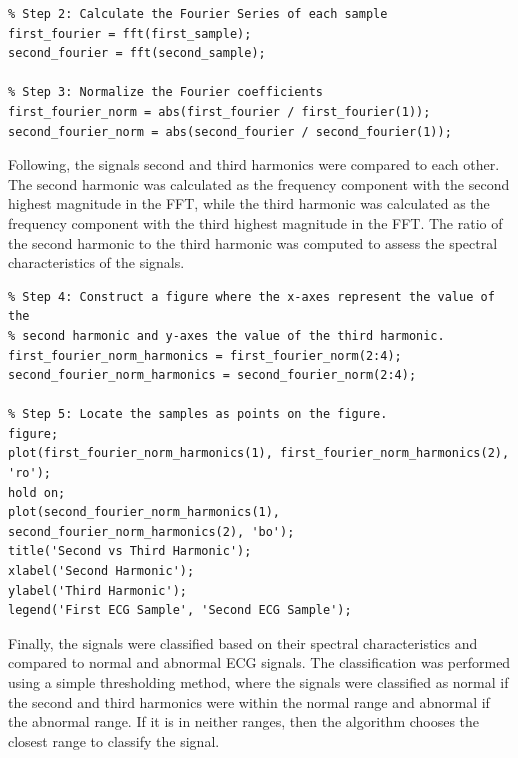 \documentclass{zc-ust-hw}
\begin{document}
\begin{verbatim}
% Step 2: Calculate the Fourier Series of each sample
first_fourier = fft(first_sample);
second_fourier = fft(second_sample);

% Step 3: Normalize the Fourier coefficients
first_fourier_norm = abs(first_fourier / first_fourier(1));
second_fourier_norm = abs(second_fourier / second_fourier(1));
\end{verbatim}

Following, the signals second and third harmonics were compared to each other.
The second harmonic was calculated as the frequency component with the second 
highest magnitude in the FFT, while the third harmonic was calculated as the
frequency component with the third highest magnitude in the FFT. The ratio of
the second harmonic to the third harmonic was computed to assess the spectral
characteristics of the signals.

\begin{verbatim}
% Step 4: Construct a figure where the x-axes represent the value of the
% second harmonic and y-axes the value of the third harmonic.
first_fourier_norm_harmonics = first_fourier_norm(2:4);
second_fourier_norm_harmonics = second_fourier_norm(2:4);

% Step 5: Locate the samples as points on the figure.
figure;
plot(first_fourier_norm_harmonics(1), first_fourier_norm_harmonics(2), 'ro');
hold on;
plot(second_fourier_norm_harmonics(1), second_fourier_norm_harmonics(2), 'bo');
title('Second vs Third Harmonic');
xlabel('Second Harmonic');
ylabel('Third Harmonic');
legend('First ECG Sample', 'Second ECG Sample');
\end{verbatim}

Finally, the signals were classified based on their spectral characteristics
and compared to normal and abnormal ECG signals. The classification was
performed using a simple thresholding method, where the signals were classified
as normal if the second and third harmonics were within the normal range
and abnormal if the abnormal range. If it is in neither ranges, then the algorithm
chooses the closest range to classify the signal.
\end{document}
